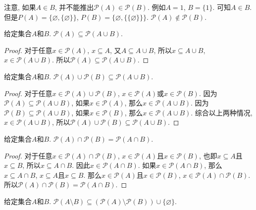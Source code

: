 注意, 如果$A\in B$, 并不能推出$\mathscr P(A)\in \mathscr P(B)$. 例如$A=1$, $B=\{1\}$. 可知$A\in B$. 但是$P(A)=\{\varnothing,\{\varnothing\}\}$, $P(B)=\{\varnothing, \{\{\varnothing\}\}\}$. $\mathscr P(A)\notin \mathscr P(B)$.

\begin{proposition}
	给定集合$A$和$B$. $\mathscr P(A)\subseteq \mathscr P(A\cup B)$.
\end{proposition}

\begin{proof}
	对于任意$x\in \mathscr P(A)$, $x\subseteq A$, 又$A\subseteq A\cup B$, 所以$x\subseteq A\cup B$, $x\in \mathscr P(A\cup B)$. 所以$\mathscr P(A)\subseteq \mathscr P(A\cup B)$.
\end{proof}

\begin{proposition}
	给定集合$A$和$B$. $\mathscr P(A)\cup \mathscr P(B)\subseteq \mathscr P(A\cup B)$.
\end{proposition}

\begin{proof}
	对于任意$x\in \mathscr P(A)\cup \mathscr P(B)$, $x\in \mathscr P(A)$或$x\in \mathscr P(B)$. 因为$\mathscr P(A)\subseteq \mathscr P(A\cup B)$, 如果$x\in \mathscr P(A)$, 那么$x\in \mathscr P(A\cup B)$. 因为$\mathscr P(B)\subseteq \mathscr P(A\cup B)$, 如果$x\in \mathscr P(B)$, 那么$x\in \mathscr P(A\cup B)$. 综合以上两种情况, $x\in \mathscr P(A\cup B)$, 所以$\mathscr P(A)\cup \mathscr P(B)\subseteq \mathscr P(A\cup B)$.
\end{proof}

\begin{proposition}
	给定集合$A$和$B$. $\mathscr P(A)\cap \mathscr P(B)=\mathscr P(A\cap B)$.
\end{proposition}

\begin{proof}
	对于任意$x\in \mathscr P(A)\cap \mathscr P(B)$, $x\in \mathscr P(A)$且$x\in \mathscr P(B)$, 也即$x\subseteq A$且$x\subseteq B$, 所以$x\subseteq A\cap B$. 因此$x\in \mathscr P(A\cap B)$. 如果$x\in \mathscr P(A\cap B)$, 那么$x\subseteq A\cap B$, $x\subseteq A$且$x\subseteq B$. 那么$x\in \mathscr P(A)$且$x\in \mathscr P(B)$, $x\in \mathscr P(A)\cap \mathscr P(B)$. 所以$\mathscr P(A)\cap \mathscr P(B)=\mathscr P(A\cap B)$.
\end{proof}

\begin{proposition}
	给定集合$A$和$B$. $\mathscr P(A\setminus B)\subseteq (\mathscr P(A)\setminus \mathscr P(B))\cup \{\varnothing\}$.
\end{proposition}

